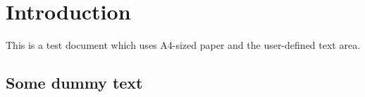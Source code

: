 \documentclass{article}
\begin{document}


\section{Introduction}
This is a test document which uses A4-sized paper and the user-defined text area. 

\subsection{Some dummy text}
\blindtext[8]
\end{document}
